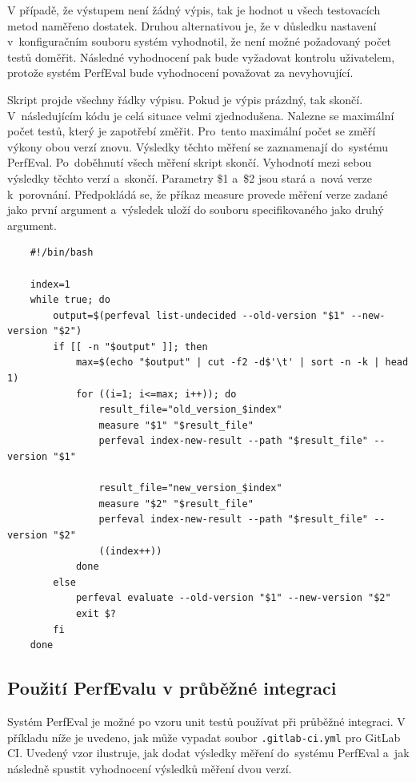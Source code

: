 V případě, že výstupem není žádný výpis, tak je hodnot u všech testovacích metod naměřeno dostatek. Druhou alternativou
je, že v důsledku nastavení v~konfiguračním souboru systém vyhodnotil, že není možné požadovaný
počet testů doměřit. Následné vyhodnocení pak bude vyžadovat kontrolu uživatelem, protože
systém PerfEval bude vyhodnocení považovat za nevyhovující.

Skript projde všechny řádky výpisu. Pokud je výpis prázdný, tak skončí.
V~následujícím kódu je celá situace velmi zjednodušena. Nalezne se maximální počet
testů, který je zapotřebí změřit. Pro~tento maximální počet se změří výkony obou verzí znovu. Výsledky těchto měření
se zaznamenají do~systému PerfEval. Po~doběhnutí všech měření skript skončí. Vyhodnotí mezi sebou výsledky těchto
verzí a~skončí. Parametry \$1 a~\$2 jsou stará a~nová verze k~porovnání. Předpokládá se, že
příkaz measure provede měření verze zadané jako první argument a~výsledek uloží do souboru specifikovaného jako druhý argument.

\begin{lstlisting}
    #!/bin/bash

    index=1
    while true; do
        output=$(perfeval list-undecided --old-version "$1" --new-version "$2")
        if [[ -n "$output" ]]; then
            max=$(echo "$output" | cut -f2 -d$'\t' | sort -n -k | head 1)
            for ((i=1; i<=max; i++)); do
                result_file="old_version_$index"
                measure "$1" "$result_file"
                perfeval index-new-result --path "$result_file" --version "$1"

                result_file="new_version_$index"
                measure "$2" "$result_file"
                perfeval index-new-result --path "$result_file" --version "$2"
                ((index++))
            done
        else
            perfeval evaluate --old-version "$1" --new-version "$2"
            exit $?
        fi
    done

\end{lstlisting}

\subsection{Použití PerfEvalu v průběžné integraci}

Systém PerfEval je možné po vzoru unit testů používat při průběžné integraci.
V příkladu níže je uvedeno, jak může vypadat soubor \texttt{.gitlab-ci.yml} pro GitLab CI.
Uvedený vzor ilustruje, jak dodat výsledky měření do~systému PerfEval a~jak následně
spustit vyhodnocení výsledků měření dvou verzí.

